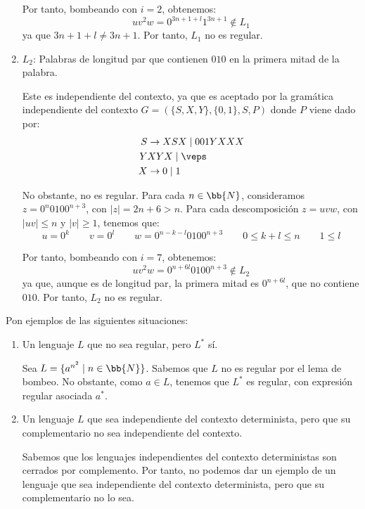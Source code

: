 \documentclass[12pt]{article}
\begin{document}
\begin{ejercicio}[1.25 puntos]
\begin{enumerate}
        Por tanto, bombeando con $i=2$, obtenemos:
        \begin{equation*}
            uv^2w=0^{3n+1+l}1^{3n+1}\notin L_1
        \end{equation*}
        ya que $3n+1+l\neq 3n+1$. Por tanto, $L_1$ no es regular.
        \item $L_2$: Palabras de longitud par que contienen $010$ en la primera mitad de la palabra.
        
        Este es independiente del contexto, ya que es aceptado por la gramática independiente del contexto $G=(\{S,X,Y\}, \{0,1\}, S, P)$ donde $P$ viene dado por:
        \begin{align*}
            S &\rightarrow XSX\mid 001YXXX\\
            Y & XYX \mid \veps\\
            X & \rightarrow 0\mid 1
        \end{align*}

        No obstante, no es regular. Para cada $n\in \bb{N}$, consideramos $z=0^{n}0100^{n+3}$, con $|z|=2n+6>n$. Para cada descomposición $z=uvw$, con $|uv|\leq n$ y $|v|\geq 1$, tenemos que:
        \begin{equation*}
            u=0^k \qquad v=0^l\qquad w=0^{n-k-l}0100^{n+3}
            \qquad 0\leq k+l\leq n \qquad 1\leq l
        \end{equation*}

        Por tanto, bombeando con $i=7$, obtenemos:
        \begin{equation*}
            uv^2w=0^{n+6l}0100^{n+3}\notin L_2
        \end{equation*}
        ya que, aunque es de longitud par, la primera mitad es $0^{n+6l}$, que no contiene $010$. Por tanto, $L_2$ no es regular.
    \end{enumerate}
\end{ejercicio}

\begin{ejercicio}[1.25 puntos]
    Pon ejemplos de las siguientes situaciones:
    \begin{enumerate}
        \item Un lenguaje $L$ que no sea regular, pero $L^*$ sí.
        
        Sea $L=\{a^{n^2}\mid n\in \bb{N}\}$. Sabemos que $L$ no es regular por el lema de bombeo.
        No obstante, como $a\in L$, tenemos que $L^*$ es regular, con expresión regular asociada $a^*$.
        \item Un lenguaje $L$ que sea independiente del contexto determinista, pero que su complementario no sea independiente del contexto.
        
        Sabemos que los lenguajes independientes del contexto deterministas son cerrados por complemento. Por tanto, no podemos dar un ejemplo de un lenguaje que sea independiente del contexto determinista, pero que su complementario no lo sea.
    \end{enumerate}
\end{ejercicio}
\end{document}
